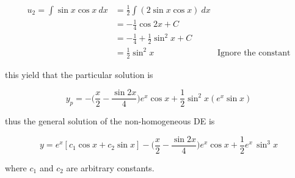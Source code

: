 \begin{solution}
    \begin{align*}
        u_2 = \int \sin x \cos x \> dx &= \frac{1}{2} \int (2 \sin x \cos x) \> dx\\
        &= -\frac{1}{4} \cos 2x + C \\
        &= -\frac{1}{4} + \frac{1}{2} \sin^2 x + C\\
        &= \frac{1}{2} \sin^2 x & \text{Ignore the constant}
    \end{align*}

    this yield that the particular solution is 

    \[
        y_p = - \biggl(\frac{x}{2} - \frac{\sin 2x}{4} \biggr) e^x \cos x 
        + \frac{1}{2} \sin^2 x (e^x \sin x)
    \]

    thus the general solution of the non-homogeneous DE is
    
    \[
        y = e^x[c_1 \cos x + c_2 \sin x] - \biggl(\frac{x}{2} - \frac{\sin 2x}{4} \biggr) e^x \cos x 
        + \frac{1}{2} e^x \, \sin^3 x
    \]

    where $c_1$ and $c_2$ are arbitrary constants.
\end{solution}